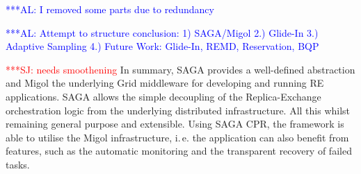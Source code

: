 \documentclass{rspublic}
\newcommand{\alnote}[1]{ {\textcolor{blue} { ***AL: #1 }}}
\newcommand{\jhanote}[1]{ {\textcolor{red} { ***SJ: #1 }}}
\newcommand{\alnote}[1]{}
\newcommand{\jhanote}[1]{}
\begin{document}
{\alnote{I removed some parts due to redundancy}
% 
% 




                    
\alnote{Attempt to structure conclusion:
1) SAGA/Migol 2.) Glide-In 3.) Adaptive Sampling 4.) Future Work: Glide-In, REMD, Reservation, BQP}
                                         
\jhanote{needs smoothening} In summary, SAGA provides a well-defined abstraction 
and Migol the underlying Grid middleware for developing and running
RE applications.
SAGA allows the simple decoupling of the Replica-Exchange orchestration 
logic from the underlying distributed infrastructure. All this whilst remaining
general purpose and extensible. 
Using SAGA CPR, the framework is able to utilise the Migol infrastructure, 
i.\,e. the application can also benefit from features, such as the automatic 
monitoring and the transparent recovery of failed tasks.  
                 
}
\end{document}
